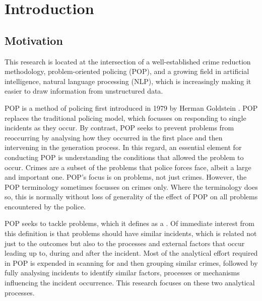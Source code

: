 \chapter{Introduction}

\section{Motivation}
This research is located at the intersection of a well-established crime reduction methodology, problem-oriented policing (POP), and a growing field in artificial intelligence, natural language processing (NLP), which is increasingly making it easier to draw information from unstructured data.

POP is a method of policing first introduced in 1979 by Herman Goldstein \parencite{gold79} . POP replaces the traditional policing model, which focusses on responding to single incidents as they occur. By contrast, POP seeks to prevent problems from reoccurring by analysing how they occurred in the first place and then intervening in the generation process. In this regard, an essential element for conducting POP is understanding the conditions that allowed the problem to occur. Crimes are a subset of the problems that police forces face, albeit a large and important one. POP’s focus is on problems, not just crimes. However, the POP terminology sometimes focusses on crimes only. Where the terminology does so, this is normally without loss of generality of the effect of POP on all problems encountered by the police.

POP seeks to tackle problems, which it defines as a  \parencite{popchap11}. Of immediate interest from this definition is that problems should have similar incidents, which is related not just to the outcomes but also to the processes and external factors that occur leading up to, during and after the incident. Most of the analytical effort required in POP is expended in scanning for and then grouping similar crimes, followed by fully analysing incidents to identify similar factors, processes or mechanisms influencing the incident occurrence. This research focuses on these two analytical processes.

